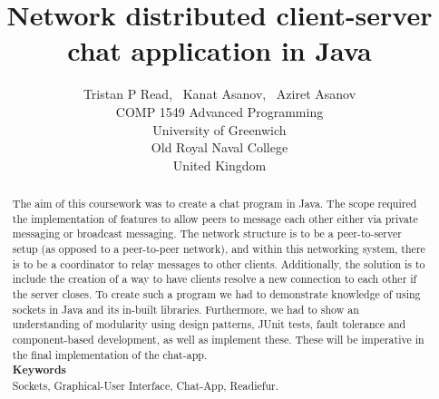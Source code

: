 \documentclass{COMPXXXX}
\begin{document}
\title {Network distributed client-server chat application in Java}

\author {Tristan P Read,~
Kanat Asanov,~
Aziret Asanov\\
\hspace
    COMP 1549 Advanced Programming\\
	University of Greenwich\\
Old Royal Naval College\\
United Kingdom
        }

\maketitle


\begin{abstract}

\normalsize \textrm {The aim of this coursework was to create a chat program in Java. The scope required the implementation of features to allow peers to message each other either via private messaging or broadcast messaging. The network structure is to be a peer-to-server setup (as opposed to a peer-to-peer network), and within this networking system, there is to be a coordinator to relay messages to other clients. Additionally, the solution is to include the creation of a way to have clients resolve a new connection to each other if the server closes. To create such a program we had to demonstrate knowledge of using sockets in Java and its in-built libraries. Furthermore, we had to show an understanding of modularity using design patterns, JUnit tests, fault tolerance and component-based development, as well as implement these. These will be imperative in the final implementation of the chat-app.}\\
\textbf{Keywords}\\
\normalsize \textrm {Sockets, Graphical-User Interface, Chat-App, Readiefur.}

\end{abstract}
\end{document}
